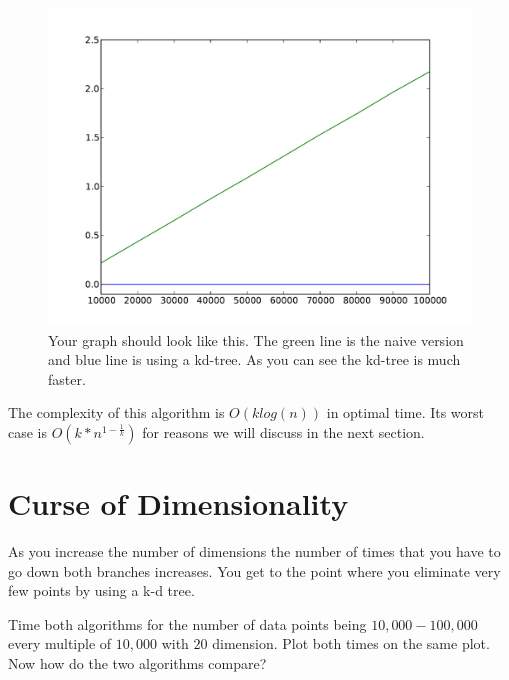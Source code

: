 \begin{figure}[H]
\includegraphics[scale = .5]{4dTime.pdf}
\caption{Your graph should look like this. The green line is the naive version and blue line is using a kd-tree. As you can see the kd-tree is much faster.}
\end{figure}

The complexity of this algorithm is $O(klog(n))$ in optimal time. Its worst case is $O(k*n^{1-\frac{1}{k}})$ for reasons we will discuss in the next section.
\section*{Curse of Dimensionality}

As you increase the number of dimensions the number of times that you have to go down both branches increases. You get to the point where you eliminate very few points by using a k-d tree.

\begin{problem}
Time both algorithms for the number of data points being $10,000-100,000$ every multiple of $10,000$ with $20$ dimension. Plot both times on the same plot. Now how do the two algorithms compare?
\end{problem}

